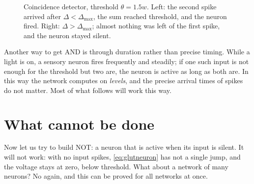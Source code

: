 \begin{figure}[t]
\centering
{}
\caption{Coincidence detector, threshold $\theta=1.5w$. Left: the second spike arrived after $\Delta<\Delta_{\max}$, the sum reached threshold, and the neuron fired. Right: $\Delta>\Delta_{\max}$; almost nothing was left of the first spike, and the neuron stayed silent.}
\label{fig:coincidence}
\end{figure}

Another way to get AND is through duration rather than precise timing. While a light is on, a sensory neuron fires frequently and steadily; if one such input is not enough for the threshold but two are, the neuron is active as long as both are. In this way the network computes on \emph{levels}, and the precise arrival times of spikes do not matter. Most of what follows will work this way.

\section{What cannot be done}

Now let us try to build NOT: a neuron that is active when its input is silent. It will not work: with no input spikes, \eqref{eq:glutneuron} has not a single jump, and the voltage stays at zero, below threshold. What about a network of many neurons? No again, and this can be proved for all networks at once.

